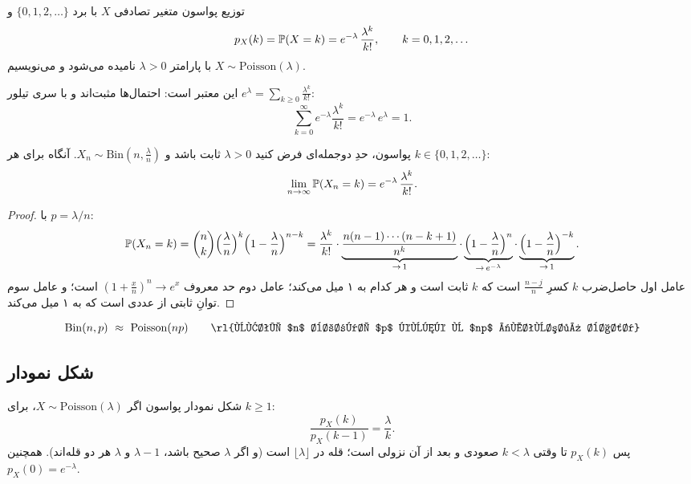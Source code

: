 \begin{definition}[label=def:poisson]{توزیع پواسون}
متغیر تصادفی $X$ با برد $\{0,1,2,\dots\}$ و
\[ p_X(k)=\P(X=k)=e^{-\lambda}\,\frac{\lambda^k}{k!},\qquad k=0,1,2,\dots \]
 با پارامتر $\lambda>0$ نامیده می‌شود و می‌نویسیم $X\sim\mathrm{Poisson}(\lambda)$.
\end{definition}

این  معتبر است: احتمال‌ها مثبت‌اند و با سری تیلور $e^\lambda=\sum_{k\ge0}\frac{\lambda^k}{k!}$:
\[ \sum_{k=0}^{\infty}e^{-\lambda}\frac{\lambda^k}{k!}=e^{-\lambda}\,e^{\lambda}=1. \]

\begin{theorem}[label=thm:poisson-limit]{پواسون، حدِ دوجمله‌ای}
فرض کنید $\lambda>0$ ثابت باشد و $X_n\sim\mathrm{Bin}(n,\frac{\lambda}{n})$. آنگاه برای هر $k\in\{0,1,2,\dots\}$:
\[ \lim_{n\to\infty}\P(X_n=k)=e^{-\lambda}\,\frac{\lambda^k}{k!}. \]
\end{theorem}

\begin{proof}
با $p=\lambda/n$:
\[ \P(X_n=k)=\binom nk\Bigl(\frac\lambda n\Bigr)^k\Bigl(1-\frac\lambda n\Bigr)^{n-k}
=\frac{\lambda^k}{k!}\cdot\underbrace{\frac{n(n-1)\cdots(n-k+1)}{n^k}}_{\to\,1}\cdot\underbrace{\Bigl(1-\frac\lambda n\Bigr)^{n}}_{\to\,e^{-\lambda}}\cdot\underbrace{\Bigl(1-\frac\lambda n\Bigr)^{-k}}_{\to\,1}. \]
عامل اول حاصل‌ضرب $k$ کسرِ $\frac{n-j}{n}$ است که $k$ ثابت است و هر کدام به ۱ میل می‌کند؛ عامل دوم حد معروف ${(1+\frac xn)^n\to e^x}$ است؛ و عامل سوم توانِ ثابتی از عددی است که به ۱ میل می‌کند.
\end{proof}

\begin{keyformula}
\[ \mathrm{Bin}(n,p)\ \approx\ \mathrm{Poisson}(np)\qquad\text{\rl{وقتی $n$ بزرگ، $p$ کوچک و $np$ «متوسط» باشد}} \]
\end{keyformula}

\subsection{شکل نمودار}

\begin{proposition}[label=prop:poisson-mode]{شکل نمودار پواسون}
اگر $X\sim\mathrm{Poisson}(\lambda)$، برای $k\ge1$:
\[ \frac{p_X(k)}{p_X(k-1)}=\frac{\lambda}{k}. \]
پس $p_X(k)$ تا وقتی $k<\lambda$ صعودی و بعد از آن نزولی است؛ قله در $\lfloor\lambda\rfloor$ است (و اگر $\lambda$ صحیح باشد، $\lambda-1$ و $\lambda$ هر دو قله‌اند). همچنین $p_X(0)=e^{-\lambda}$.
\end{proposition}

